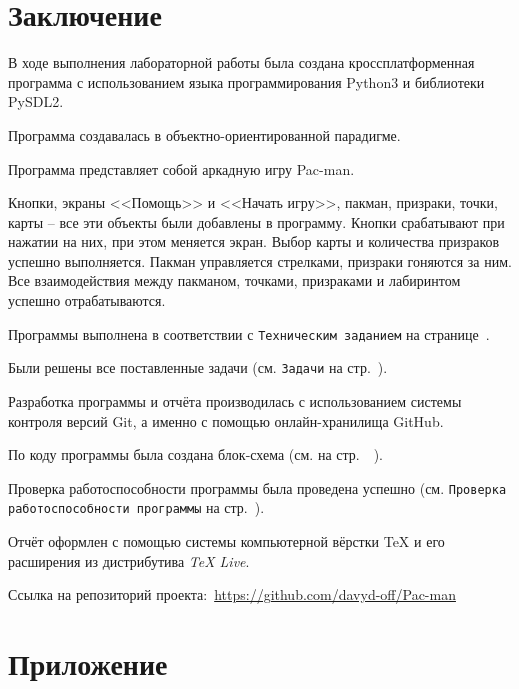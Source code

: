 \documentclass[14pt, oneside]{altsu-report}
\begin{document}

 

\chapter*{Заключение}
В ходе выполнения лабораторной работы была создана кроссплатформенная программа с использованием языка программирования Python3 и библиотеки PySDL2.

Программа создавалась в объектно-ориентированной парадигме.

Программа представляет собой аркадную игру Pac-man.

Кнопки, экраны <<Помощь>> и <<Начать игру>>, пакман, призраки, точки, карты -- все эти объекты были добавлены в программу. Кнопки срабатывают при нажатии на них, при этом меняется экран. Выбор карты и количества призраков успешно выполняется. Пакман управляется стрелками, призраки гоняются за ним. Все взаимодействия между пакманом, точками, призраками и лабиринтом успешно отрабатываются. 

Программы выполнена в соответствии с \texttt{Техническим заданием} на странице~\pageref{sec:ch01/sec01}.

Были решены все поставленные задачи (см. \texttt{Задачи} на стр.~\pageref{zadachi}).

Разработка программы и отчёта производилась с использованием системы контроля версий Git, а именно с помощью онлайн-хранилища GitHub.

По коду программы была создана блок-схема (см. на стр.~\pageref{fig7}~\pageref{fig8}).

Проверка работоспособности программы была проведена успешно (см. \texttt{Проверка работоспособности программы} на стр.~\pageref{sec:ch02/sec02}).

Отчёт оформлен с помощью системы компьютерной вёрстки \TeX{} и его расширения \XeTeX{} из дистрибутива \textit{TeX Live}.

Ссылка на репозиторий проекта:~\textcolor{blue}{\url{https://github.com/davyd-off/Pac-man}}

\newpage
{}
\printbibliography[title={Список использованной литературы}]

\appendix
\newpage
\chapter*{\raggedleft\label{appendix1}Приложение}
\end{document}
